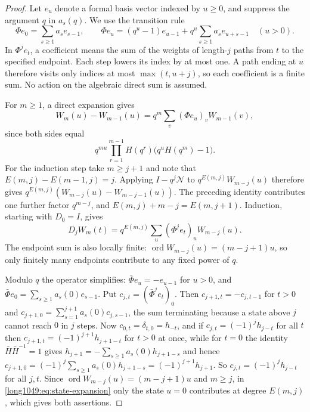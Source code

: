 \documentclass[11pt]{article}
\begin{document}
\begin{proof}
Let $e_u$ denote a formal basis vector indexed by $u\ge0$, and suppress
the argument $q$ in $a_s(q)$. We use the transition rule
\[
 \Phi e_0=\sum_{s\ge1}a_se_{s-1},
 \qquad
 \Phi e_u=(q^{u}-1)e_{u-1}+q^{u}\sum_{s\ge1}a_se_{u+s-1}\quad(u>0).
\]
In $\Phi^je_t$, a coefficient means the sum of the weights of length-$j$
paths from $t$ to the specified endpoint. Each step lowers its index by
at most one. A path ending at $u$ therefore visits only indices at most
$\max(t,u+j)$, so each coefficient is a finite sum. No action on the
algebraic direct sum is assumed.

For $m\ge1$, a direct expansion gives
\[
 W_m(u)-W_{m-1}(u)=q^m\sum_v(\Phi e_u)_vW_{m-1}(v),
\]
since both sides equal
\[
 q^{mu}\prod_{r=1}^{m-1}H(q^r)\bigl(q^uH(q^m)-1\bigr).
\]
For the induction step take $m\ge j+1$ and note that
$E(m,j)-E(m-1,j)=j$. Applying $I-q^j\mathcal N$ to $q^{E(m,j)}W_{m-j}(u)$ therefore gives
$q^{E(m,j)}(W_{m-j}(u)-W_{m-j-1}(u))$.
The preceding identity contributes one further factor $q^{m-j}$, and
$E(m,j)+m-j=E(m,j+1)$. Induction, starting with $D_0=I$, gives
\begin{equation}\label{long1049:eq:state-expansion}
 D_jW_m(t)=q^{E(m,j)}\sum_u(\Phi^{j}e_t)_uW_{m-j}(u).
\end{equation}
The endpoint sum is also locally finite:
$\operatorname{ord}W_{m-j}(u)=(m-j+1)u$, so only finitely many endpoints
contribute to any fixed power of $q$.

Modulo $q$ the operator simplifies: $\bar\Phi e_u=-e_{u-1}$ for $u>0$, and
$\bar\Phi e_0=\sum_{s\ge1}a_s(0)e_{s-1}$.  Put $c_{j,t}=(\bar\Phi^{j}e_t)_0$.
Then $c_{j+1,t}=-c_{j,t-1}$ for $t>0$ and
$c_{j+1,0}=\sum_{s=1}^{j+1}a_s(0)c_{j,s-1}$, the sum terminating because a state
above $j$ cannot reach $0$ in $j$ steps.  Now $c_{0,t}=\delta_{t,0}=h_{-t}$, and
if $c_{j,t}=(-1)^{j}h_{j-t}$ for all $t$ then $c_{j+1,t}=(-1)^{j+1}h_{j+1-t}$ for
$t>0$ at once, while for $t=0$ the identity $\bar H\bar H^{-1}=1$ gives
$h_{j+1}=-\sum_{s\ge1}a_s(0)h_{j+1-s}$ and hence
$c_{j+1,0}=(-1)^{j}\sum_{s\ge1}a_s(0)h_{j+1-s}=(-1)^{j+1}h_{j+1}$.  So
$c_{j,t}=(-1)^{j}h_{j-t}$ for all $j,t$.  Since
$\operatorname{ord}W_{m-j}(u)=(m-j+1)u$ and $m\ge j$, in
\eqref{long1049:eq:state-expansion} only the state $u=0$ contributes at degree $E(m,j)$,
which gives both assertions.
\end{proof}
\end{document}
